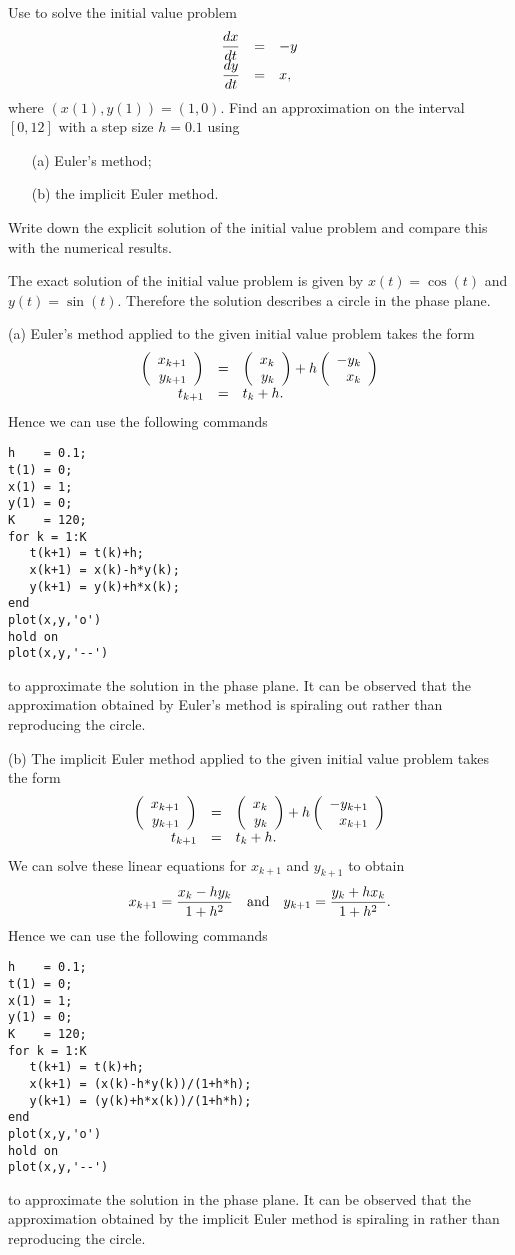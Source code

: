 \documentclass{ximera}
\begin{document}
\begin{computerExercise} \label{c15.1.9}
Use \Matlab to solve the initial value problem
\arraystart
\[
\begin{array}{rcl}
\displaystyle \frac{dx}{dt} & = & -y\\
\displaystyle \frac{dy}{dt} & = & x,
\end{array}
\]
\arrayfinish
where $(x(1),y(1))= (1,0)$.  Find an approximation 
on the interval $[0,12]$ with a step size $h=0.1$ using 
\begin{itemize}
\item[(a)] Euler's method;
\item[(b)] the implicit Euler method.
\end{itemize}
Write down the explicit solution of the initial
value problem and compare this with the numerical
results.  

\begin{solution}
The exact solution of the initial value problem
is given by $x(t) = \cos(t)$ and $y(t)=\sin(t)$.  Therefore the
solution describes a circle in the phase plane.

(a) Euler's method applied to the given initial value problem
takes the form
\[
\begin{array}{rcl}
\left(\begin{array}{r} x_{k+1} \\ y_{k+1}\end{array}\right) & = &
\left(\begin{array}{r} x_k \\ y_k\end{array}\right) + h \left(\begin{array}{r} -y_k \\ x_k\end{array}\right)\\
t_{k+1} & = & t_k + h.
\end{array}
\]
Hence we can use the following \Matlab commands
\begin{verbatim}
h    = 0.1;
t(1) = 0;
x(1) = 1;
y(1) = 0;
K    = 120;
for k = 1:K
   t(k+1) = t(k)+h;
   x(k+1) = x(k)-h*y(k);
   y(k+1) = y(k)+h*x(k);
end
plot(x,y,'o')
hold on
plot(x,y,'--')
\end{verbatim}
to approximate the solution in the phase plane.  It can be observed
that the approximation obtained by Euler's method is spiraling out
rather than reproducing the circle.

(b)  The implicit Euler method applied to the given initial value
problem takes the form
\[
\begin{array}{rcl}
\left(\begin{array}{r} x_{k+1} \\ y_{k+1}\end{array}\right) & = &
\left(\begin{array}{r} x_k \\ y_k\end{array}\right) + h \left(\begin{array}{r} -y_{k+1} \\ x_{k+1}\end{array}\right)\\
t_{k+1} & = & t_k + h.
\end{array}
\]
We can solve these linear equations for $x_{k+1}$ and $y_{k+1}$ to obtain
\[
x_{k+1} = \frac{x_k-hy_k}{1+h^2} \quad\mbox{and}\quad
y_{k+1} = \frac{y_k+hx_k}{1+h^2}.
\]
Hence we can use the following \Matlab commands
\begin{verbatim}
h    = 0.1;
t(1) = 0;
x(1) = 1;
y(1) = 0;
K    = 120;
for k = 1:K
   t(k+1) = t(k)+h;
   x(k+1) = (x(k)-h*y(k))/(1+h*h);
   y(k+1) = (y(k)+h*x(k))/(1+h*h);
end
plot(x,y,'o')
hold on
plot(x,y,'--')
\end{verbatim}
to approximate the solution in the phase plane.  It can be observed
that the approximation obtained by the implicit Euler method is
spiraling in rather than reproducing the circle.





\end{solution}
\end{computerExercise}
\end{document}
